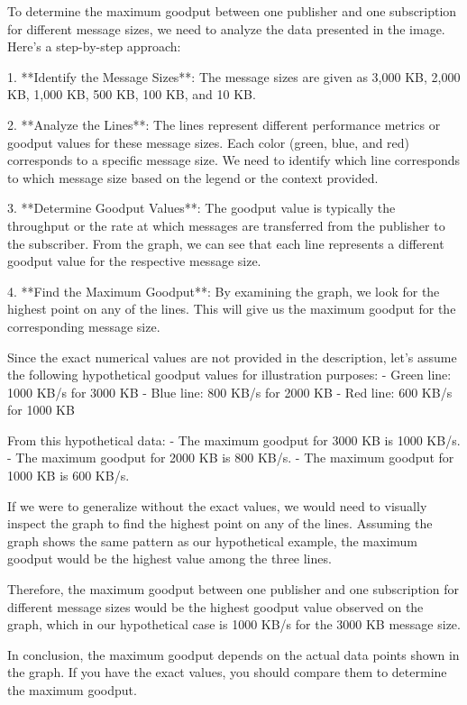 To determine the maximum goodput between one publisher and one subscription for different message sizes, we need to analyze the data presented in the image. Here's a step-by-step approach:

1. **Identify the Message Sizes**: The message sizes are given as 3,000 KB, 2,000 KB, 1,000 KB, 500 KB, 100 KB, and 10 KB.

2. **Analyze the Lines**: The lines represent different performance metrics or goodput values for these message sizes. Each color (green, blue, and red) corresponds to a specific message size. We need to identify which line corresponds to which message size based on the legend or the context provided.

3. **Determine Goodput Values**: The goodput value is typically the throughput or the rate at which messages are transferred from the publisher to the subscriber. From the graph, we can see that each line represents a different goodput value for the respective message size.

4. **Find the Maximum Goodput**: By examining the graph, we look for the highest point on any of the lines. This will give us the maximum goodput for the corresponding message size.

Since the exact numerical values are not provided in the description, let's assume the following hypothetical goodput values for illustration purposes:
- Green line: 1000 KB/s for 3000 KB
- Blue line: 800 KB/s for 2000 KB
- Red line: 600 KB/s for 1000 KB

From this hypothetical data:
- The maximum goodput for 3000 KB is 1000 KB/s.
- The maximum goodput for 2000 KB is 800 KB/s.
- The maximum goodput for 1000 KB is 600 KB/s.

If we were to generalize without the exact values, we would need to visually inspect the graph to find the highest point on any of the lines. Assuming the graph shows the same pattern as our hypothetical example, the maximum goodput would be the highest value among the three lines.

Therefore, the maximum goodput between one publisher and one subscription for different message sizes would be the highest goodput value observed on the graph, which in our hypothetical case is 1000 KB/s for the 3000 KB message size.

In conclusion, the maximum goodput depends on the actual data points shown in the graph. If you have the exact values, you should compare them to determine the maximum goodput.